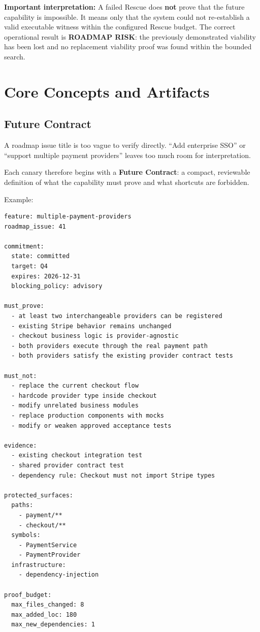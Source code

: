 \documentclass[12pt]{article}
\newcommand{\statusrisk}{\textbf{\color{red}ROADMAP RISK}}
\begin{document}
\begin{notebox}
\textbf{Important interpretation:}
A failed Rescue does \textbf{not} prove that the future capability is impossible. It means only that the system could not re-establish a valid executable witness within the configured Rescue budget. The correct operational result is \statusrisk: the previously demonstrated viability has been lost and no replacement viability proof was found within the bounded search.
\end{notebox}

\section{Core Concepts and Artifacts}

\subsection{Future Contract}

A roadmap issue title is too vague to verify directly. ``Add enterprise SSO'' or ``support multiple payment providers'' leaves too much room for interpretation.

Each canary therefore begins with a \textbf{Future Contract}: a compact, reviewable definition of what the capability must prove and what shortcuts are forbidden.

Example:

\begin{lstlisting}
feature: multiple-payment-providers
roadmap_issue: 41

commitment:
  state: committed
  target: Q4
  expires: 2026-12-31
  blocking_policy: advisory

must_prove:
  - at least two interchangeable providers can be registered
  - existing Stripe behavior remains unchanged
  - checkout business logic is provider-agnostic
  - both providers execute through the real payment path
  - both providers satisfy the existing provider contract tests

must_not:
  - replace the current checkout flow
  - hardcode provider type inside checkout
  - modify unrelated business modules
  - replace production components with mocks
  - modify or weaken approved acceptance tests

evidence:
  - existing checkout integration test
  - shared provider contract test
  - dependency rule: Checkout must not import Stripe types

protected_surfaces:
  paths:
    - payment/**
    - checkout/**
  symbols:
    - PaymentService
    - PaymentProvider
  infrastructure:
    - dependency-injection

proof_budget:
  max_files_changed: 8
  max_added_loc: 180
  max_new_dependencies: 1
\end{lstlisting}
\end{document}
